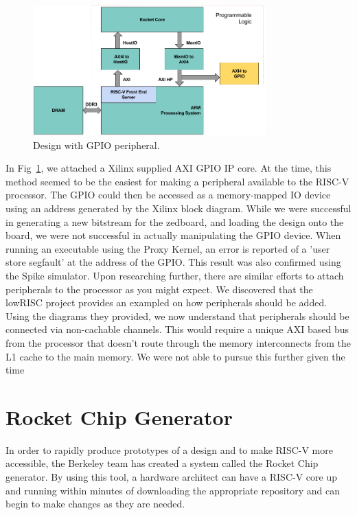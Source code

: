 \documentclass[journal]{IEEEtran}
\begin{document}
\begin{figure} %
\centering
\includegraphics[width=9cm ]{./graphics/zynq_w_gpio.png}
\centering
\caption{Design with GPIO peripheral.}
\label{fig:gpio}
\end{figure}
In Fig~\ref{fig:gpio}, we attached a Xilinx supplied AXI GPIO IP core. At the time, this method seemed to be the easiest for making a peripheral available to the RISC-V processor. The GPIO could then be accessed as a memory-mapped IO device using an address generated by the Xilinx block diagram. While we were successful in generating a new bitstream for the zedboard, and loading the design onto the board, we were not successful in actually manipulating the GPIO device. When running an executable using the Proxy Kernel\cite{pk}, an error is reported of a 'user store segfault' at the address of the GPIO. This result was also confirmed using the Spike simulator. Upon researching further, there are similar efforts to attach peripherals to the processor as you might expect. We discovered that the lowRISC project provides an exampled on how peripherals should be added\cite{lowrisc}. Using the diagrams they provided, we now understand that peripherals should be connected via non-cachable channels. This would require a unique AXI based bus from the processor that doesn't route through the memory interconnects from the L1 cache to the main memory. We were not able to pursue this further given the time 

\section{Rocket Chip Generator}
In order to rapidly produce prototypes of a design and to make RISC-V more accessible, the Berkeley team has created a system called the Rocket Chip generator. By using this tool, a hardware architect can have a RISC-V core up and running within minutes of downloading the appropriate repository and can begin to make changes as they are needed.
\end{document}
